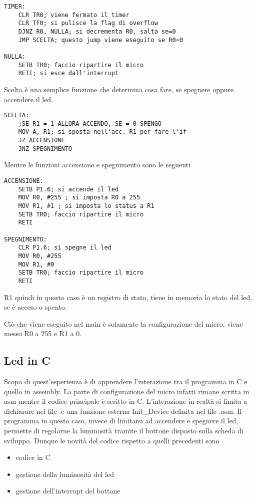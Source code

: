 \documentclass[main.tex]{subfiles}
\begin{document}
\begin{lstlisting}[caption=Funzione timer]
TIMER:
    CLR TR0; viene fermato il timer
    CLR TF0; si pulisce la flag di overflow
    DJNZ R0, NULLA; si decrementa R0, salta se=0
    JMP SCELTA; questo jump viene eseguito se R0=0

NULLA:
    SETB TR0; faccio ripartire il micro
    RETI; si esce dall'interrupt
\end{lstlisting}
 
 Scelta è una semplice funzione che determina cosa fare, se spegnere oppure accendere il led.
 \begin{lstlisting}[caption=Funzione scelta]
 SCELTA:
	;SE R1 = 1 ALLORA ACCENDO, SE = 0 SPENGO
	MOV A, R1; si sposta nell'acc. R1 per fare l'if
	JZ ACCENSIONE
	JNZ SPEGNIMENTO
 \end{lstlisting}

Mentre le funzioni accensione e spegnimento sono le seguenti
\begin{lstlisting}[caption=Funzioni accensione e spegnimento]
ACCENSIONE:
	SETB P1.6; si accende il led
	MOV R0, #255 ; si imposta R0 a 255
	MOV R1, #1 ; si imposta lo status a R1
	SETB TR0; faccio ripartire il micro
	RETI

SPEGNIMENTO:
	CLR P1.6; si spegne il led
	MOV R0, #255
	MOV R1, #0
	SETB TR0; faccio ripartire il micro
	RETI
\end{lstlisting}
R1 quindi in questo caso è un registro di stato, tiene in memoria lo stato del led, se è acceso o spento.

Ciò che viene eseguito nel main è solamente la configurazione del micro, viene messo R0 a 255 e R1 a 0.

\subsection{Led in C}\label{led in C}
Scopo di quest'esperienza è di apprendere l'interazione tra il programma in C e quello in assembly. La parte di configurazione del micro infatti rimane scritta in asm mentre il codice principale è scritto in C. L'interazione in realtà si limita a dichiarare nel file .c una funzione esterna Init\_Device definita nel file .asm. Il programma in questo caso, invece di limitarsi ad accendere e spegnere il led, permette di regolarne la luminosità tramite il bottone disposto sulla scheda di sviluppo. Dunque le novità del codice rispetto a quelli precedenti sono 
\begin{itemize}
    \item codice in C
    \item gestione della luminosità del led
    \item gestione dell'interrupt del bottone
\end{itemize}
\end{document}
